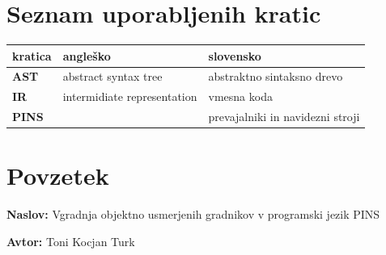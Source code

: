 \documentclass[a4paper, 12p]{book}
\newcommand{\ttitle}{Vgradnja objektno usmerjenih gradnikov v programski jezik PINS}
\newcommand{\tauthor}{Toni Kocjan Turk}
\newcommand{\clearemptydoublepage}{\newpage{\pagestyle{empty}\cleardoublepage}}
\begin{document}
\chapter*{Seznam uporabljenih kratic}  %

\noindent\begin{tabular}{l|l|l}
	{\bf kratica} & {\bf angleško} & {\bf slovensko} \\ \hline
	{\bf AST} & abstract syntax tree & abstraktno sintaksno drevo \\
	{\bf IR} & intermidiate representation & vmesna koda \\
	{\bf PINS} &  & prevajalniki in navidezni stroji \\
\end{tabular}


\clearemptydoublepage

\chapter*{Povzetek}

\noindent\textbf{Naslov:} \ttitle
\bigskip

\noindent\textbf{Avtor:} \tauthor
\bigskip
\end{document}
